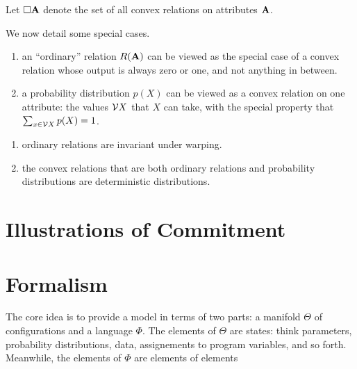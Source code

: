 \documentclass{article}
\begin{document}
Let $\square \mathbf{A}$ denote the set of all convex relations on attributes $\mathbf{A}$. 

We now detail some special cases.
\begin{enumerate}
    \item an ``ordinary'' relation $R(\mathbf{A})$
        can be viewed as the special case of a convex relation whose output is always zero or one, and not anything in between.
    \item a probability distribution $p(X)$ can be viewed as a convex relation on one attribute: the values $\mathcal V X$ that $X$ can take, with the special property that 
    $\sum_{x \in \mathcal V X}p(X) = 1$.
\end{enumerate}

\begin{remark}
    \begin{enumerate}
        \item ordinary relations are invariant under warping. 
        \item the convex relations that are both ordinary relations and probability distributions are deterministic distributions.
    \end{enumerate}
\end{remark}

\begin{defn}
    
\end{defn}

\section{Illustrations of Commitment}


\section{Formalism}
The core idea is to provide a model in terms of two parts: a manifold $\Theta$
of configurations and a language $\Phi$. 
The elements of $\Theta$ are states: think parameters, probability distributions, data, assignements to program variables, and so forth.
Meanwhile, the elements of $\Phi$ are elements of elements
\end{document}
